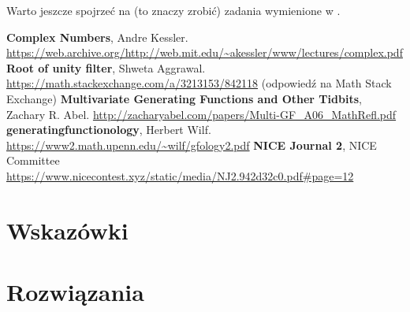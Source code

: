 \documentclass{scrartcl}
\begin{document}
    Warto jeszcze spojrzeć na (to znaczy zrobić) zadania wymienione w \cite{ref:NICE}.

\begin{thebibliography}{9}
     \textbf{Complex Numbers}, Andre Kessler.
        \url{https://web.archive.org/http://web.mit.edu/~akessler/www/lectures/complex.pdf}
     \textbf{Root of unity filter}, Shweta Aggrawal.
        \url{https://math.stackexchange.com/a/3213153/842118}
        (odpowiedź na Math Stack Exchange)
     \textbf{Multivariate Generating Functions and Other Tidbits}, Zachary R. Abel.
        \url{http://zacharyabel.com/papers/Multi-GF_A06_MathRefl.pdf}
     \textbf{generatingfunctionology}, Herbert Wilf.
        \url{https://www2.math.upenn.edu/~wilf/gfology2.pdf}
     \textbf{NICE Journal 2}, NICE Committee
        \url{https://www.nicecontest.xyz/static/media/NJ2.942d32c0.pdf#page=12}
\end{thebibliography}

\newpage
\section{Wskazówki}
    \makehints

\section{Rozwiązania}
    \makeanswers
\end{document}
